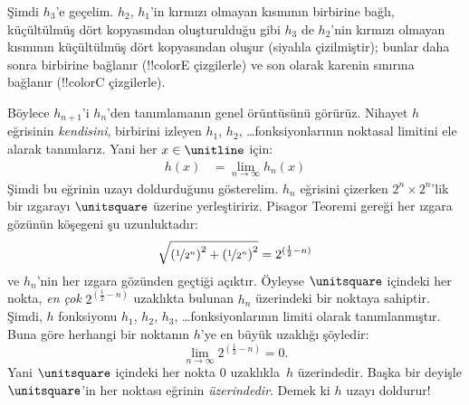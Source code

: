 \documentclass[../../../include/open-logic-section]{subfiles}
\begin{document}
Şimdi $h_3$'e geçelim. $h_2$, $h_1$'in kırmızı olmayan kısmının birbirine
bağlı, küçültülmüş dört kopyasından oluşturulduğu gibi $h_3$ de $h_2$'nin
kırmızı olmayan kısmının küçültülmüş dört kopyasından oluşur (siyahla
çizilmiştir); bunlar daha sonra birbirine bağlanır (!!{colorE} çizgilerle) ve
son olarak karenin sınırına bağlanır (!!{colorC} çizgilerle).
\begin{center}
\end{center}
Böylece $h_{n+1}$'i $h_n$'den tanımlamanın genel örüntüsünü görürüz.
Nihayet $h$ eğrisinin \emph{kendisini}, birbirini izleyen $h_1$, $h_2$,
\dots\@ fonksiyonlarının noktasal limitini ele alarak tanımlarız. Yani her
$x \in \unitline$ için:
\begin{align*}
	h(x) &= \lim_{n \rightarrow \infty} h_n(x)
\end{align*} 
Şimdi bu eğrinin uzayı doldurduğunu gösterelim. $h_n$ eğrisini çizerken
$2^n \times 2^n$'lik bir ızgarayı $\unitsquare$ üzerine yerleştiririz.
Pisagor Teoremi gereği her ızgara gözünün köşegeni şu uzunluktadır:
\[
\sqrt{\left(\nicefrac{1}{2^{n}}\right)^2+\left(\nicefrac{1}{2^{n}}\right)^2} = 2^{(\frac{1}{2}-n)}
\]
ve $h_n$'nin her ızgara gözünden geçtiği açıktır. Öyleyse $\unitsquare$
içindeki her nokta, \emph{en çok} $2^{(\frac{1}{2}-n)}$ uzaklıkta bulunan
$h_n$ üzerindeki bir noktaya sahiptir. Şimdi, $h$ fonksiyonu $h_1$, $h_2$, $h_3$,
\dots\@ fonksiyonlarının limiti olarak tanımlanmıştır. Buna göre herhangi bir
noktanın $h$'ye en büyük uzaklığı şöyledir:
\[
\lim_{n \rightarrow \infty} 2^{(\frac{1}{2}-n)} = 0.
\]
Yani $\unitsquare$ içindeki her nokta $0$ uzaklıkla~$h$ üzerindedir. Başka bir
deyişle $\unitsquare$'in her noktası eğrinin \emph{üzerindedir}. Demek ki $h$
uzayı doldurur!{}
\end{document}
